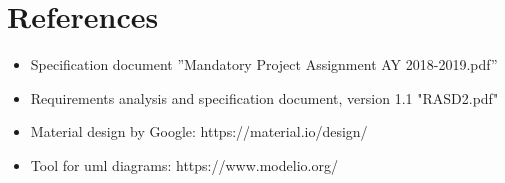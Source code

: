 \chapter{References}\label{c:ref}

\begin{itemize}
\item Specification document ”Mandatory Project Assignment AY 2018-2019.pdf”
\item Requirements analysis and specification document, version 1.1 "RASD2.pdf"
\item Material design by Google: https://material.io/design/
\item Tool for uml diagrams: https://www.modelio.org/
\end{itemize}